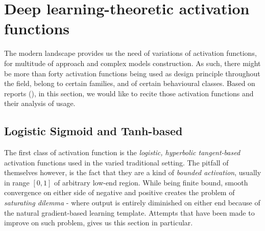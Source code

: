 \section{Deep learning-theoretic activation functions}

The modern landscape provides us the need of variations of activation functions, for multitude of approach and complex models construction. As such, there might be more than forty activation functions being used as design principle throughout the field, belong to certain families, and of certain behavioural classes. Based on reports (\cite{dubey2022activationfunctionsdeeplearning}), in this section, we would like to recite those activation functions and their analysis of usage. 

\subsection{Logistic Sigmoid and Tanh-based}
The first class of activation function is the \textit{logistic, hyperbolic tangent-based} activation functions used in the varied traditional setting. The pitfall of themselves however, is the fact that they are a kind of \textit{bounded activation}, usually in range $[0,1]$ of arbitrary low-end region. While being finite bound, smooth convergence on either side of negative and positive creates the problem of \textit{saturating dilemma} - where output is entirely diminished on either end because of the natural gradient-based learning template. Attempts that have been made to improve on such problem, gives us this section in particular. 

